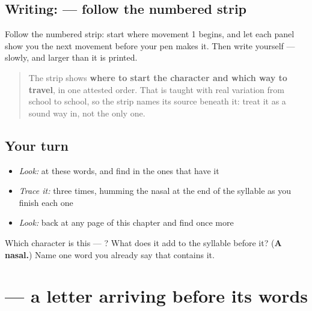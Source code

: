 \subsection*{Writing:  — follow the numbered strip}

Follow the numbered strip: start where movement 1 begins, and let each panel show you the next movement before your pen makes it. Then write  yourself — slowly, and larger than it is printed.

\begin{quote}
The strip shows \textbf{where to start the character and which way to travel}, in one attested order. That is taught with real variation from school to school, so the strip names its source beneath it: treat it as a sound way in, not the only one.
\end{quote}

\subsection*{Your turn}
\begin{itemize}
\raggedright
  \item \emph{Look:} at these words, and find  in the ones that have it
\end{itemize}

\begin{quote}
\end{quote}

\begin{itemize}
\raggedright
  \item \emph{Trace it:}  three times, humming the nasal at the end of the syllable as you finish each one
  \item \emph{Look:} back at any page of this chapter and find  once more
\end{itemize}

\begin{tcolorbox}[breakable,colback=teal!4,colframe=teal!35!black,title={Before you move on}]
Which character is this — ? What does it add to the syllable before it? (\textbf{A nasal.}) Name one word you already say that contains it.
\end{tcolorbox}
\section[\texorpdfstring{\hi{घ} (gha)}{घ (gha)}]{ — a letter arriving before its words}

